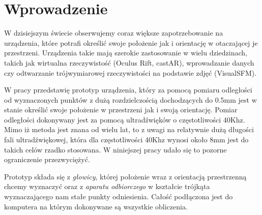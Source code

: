 
\chapter*{Wprowadzenie}

W dzisiejszym świecie obserwujemy coraz większe zapotrzebowanie na urządzenia,
które potrafi określić swoje położenie jak i orientację w otaczającej je przestrzeni.
Urządzenia takie mają szerokie zastosowanie w wielu dziedzinach, takich jak
wirtualna rzeczywistość (Oculus Rift, castAR), wprowadzanie danych czy 
odtwarzanie trójwymiarowej rzeczywistości na podstawie zdjęć (VisualSFM).


W pracy przedstawię prototyp urządzenia, który za pomocą pomiaru odległości od wyznaczonych punktów
z dużą rozdzielczością dochodzących do 0.5mm jest w stanie określić swoje położenie
w przestrzeni jak i swoją orientację. 
Pomiar odległości dokonywany jest za pomocą ultradźwięków o częstotliwości 40Khz.  
Mimo iż metoda jest znana od wielu lat, to z uwagi na relatywnie dużą długości fali ultradźwiękowej,
która dla częstotliwości 40Khz wynosi około 8mm jest do takich celów rzadko stosowana.
W niniejszej pracy udało się to pozorne ograniczenie przezwyciężyć.

Prototyp składa się z \textit{głowicy}, której położenie wraz z orientacją przestrzenną chcemy wyznaczyć
oraz z \textit{aparatu odbiorczego} w kształcie trójkąta wyznaczającego nam stałe punkty odniesienia.
Całość podłączona jest do komputera na którym dokonywane są wszystkie obliczenia.



